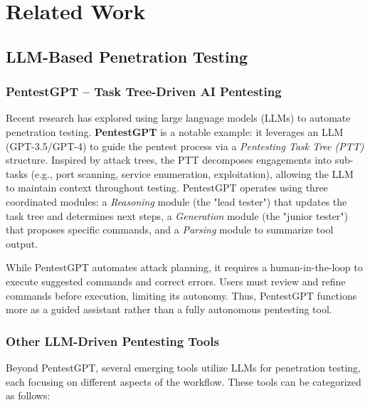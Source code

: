 \section{Related Work}
\label{sec:relatedwork}

\subsection{LLM-Based Penetration Testing}

\subsubsection{PentestGPT – Task Tree-Driven AI Pentesting}
Recent research has explored using large language models (LLMs) to automate penetration testing. \textbf{PentestGPT} \cite{pentestgpt2024} is a notable example: it leverages an LLM (GPT-3.5/GPT-4) to guide the pentest process via a \textit{Pentesting Task Tree (PTT)} structure. Inspired by attack trees, the PTT decomposes engagements into sub-tasks (e.g., port scanning, service enumeration, exploitation), allowing the LLM to maintain context throughout testing. PentestGPT operates using three coordinated modules: a \emph{Reasoning} module (the "lead tester") that updates the task tree and determines next steps, a \emph{Generation} module (the "junior tester") that proposes specific commands, and a \emph{Parsing} module to summarize tool output.

While PentestGPT automates attack planning, it requires a human-in-the-loop to execute suggested commands and correct errors. Users must review and refine commands before execution, limiting its autonomy. Thus, PentestGPT functions more as a guided assistant rather than a fully autonomous pentesting tool.

\subsubsection{Other LLM-Driven Pentesting Tools}
Beyond PentestGPT, several emerging tools utilize LLMs for penetration testing, each focusing on different aspects of the workflow. These tools can be categorized as follows:

